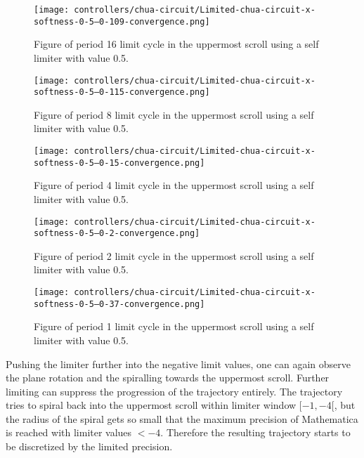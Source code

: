 \documentclass[main]{subfiles}
\begin{document}
\begin{figure}[H]
\centering
\texttt{[image: controllers/chua-circuit/Limited-chua-circuit-x-softness-0-5--0-109-convergence.png]}
\caption[Figure of period 16 limit cycle]{Figure of period 16 limit cycle in the uppermost scroll using a self limiter with value 0.5.}
\label{figure:x-0.5-16-limit-cycle-upperscroll-trajectory}
\end{figure}

\begin{figure}[H]
\centering
\texttt{[image: controllers/chua-circuit/Limited-chua-circuit-x-softness-0-5--0-115-convergence.png]}
\caption[Figure of period 8 limit cycle]{Figure of period 8 limit cycle in the uppermost scroll using a self limiter with value 0.5.}
\label{figure:x-0.5-8-limit-cycle-upperscroll-trajectory}
\end{figure}

\begin{figure}[H]
\centering
\texttt{[image: controllers/chua-circuit/Limited-chua-circuit-x-softness-0-5--0-15-convergence.png]}
\caption[Figure of period 4 limit cycle]{Figure of period 4 limit cycle in the uppermost scroll using a self limiter with value 0.5.}
\label{figure:x-0.5-4-limit-cycle-upperscroll-trajectory}
\end{figure}

\begin{figure}[H]
\centering
\texttt{[image: controllers/chua-circuit/Limited-chua-circuit-x-softness-0-5--0-2-convergence.png]}
\caption[Figure of period 2 limit cycle]{Figure of period 2 limit cycle in the uppermost scroll using a self limiter with value 0.5.}
\label{figure:x-0.5-2-limit-cycle-upperscroll-trajectory}
\end{figure}

\begin{figure}[H]
\centering
\texttt{[image: controllers/chua-circuit/Limited-chua-circuit-x-softness-0-5--0-37-convergence.png]}
\caption[Figure of period 1 limit cycle]{Figure of period 1 limit cycle in the uppermost scroll using a self limiter with value 0.5.}
\label{figure:x-0.5-1-limit-cycle-upperscroll-trajectory}
\end{figure}

Pushing the limiter further into the negative limit values, one can again observe the plane rotation and the spiralling towards the uppermost scroll. %
%
Further limiting can suppress the progression of the trajectory entirely. %
%
The trajectory tries to spiral back into the uppermost scroll within limiter window \([-1,-4[\), but the radius of the spiral gets so small that the maximum precision of Mathematica is reached with limiter values \(<-4\).
%
Therefore the resulting trajectory starts to be discretized by the limited precision.
\end{document}
